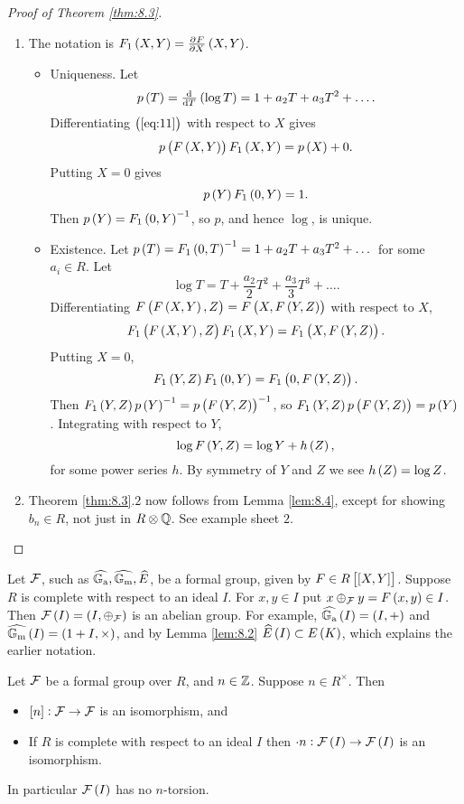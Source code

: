 \pagebreak

\begin{proof}[Proof of Theorem \ref{thm:8.3}]
\hfill
\begin{enumerate}
\item The notation is $ F_1\br{X, Y} = \tpd{F}{X}\br{X, Y} $.
\begin{itemize}
\item Uniqueness. Let
$$ p\br{T} = \tod{}{T}\br{\log T} = 1 + a_2T + a_3T^2 + \dots. $$
Differentiating $ \br{\ref{eq:11}} $ with respect to $ X $ gives
$$ p\br{F\br{X, Y}}F_1\br{X, Y} = p\br{X} + 0. $$
Putting $ X = 0 $ gives
$$ p\br{Y}F_1\br{0, Y} = 1. $$
Then $ p\br{Y} = F_1\br{0, Y}^{-1} $, so $ p $, and hence $ \log $, is unique.
\item Existence. Let $ p\br{T} = F_1\br{0, T}^{-1} = 1 + a_2T + a_3T^2 + \dots $ for some $ a_i \in R $. Let
$$ \log T = T + \dfrac{a_2}{2}T^2 + \dfrac{a_3}{3}T^3 + \dots. $$
Differentiating $ F\br{F\br{X, Y}, Z} = F\br{X, F\br{Y, Z}} $ with respect to $ X $,
$$ F_1\br{F\br{X, Y}, Z}F_1\br{X, Y} = F_1\br{X, F\br{Y, Z}}. $$
Putting $ X = 0 $,
$$ F_1\br{Y, Z}F_1\br{0, Y} = F_1\br{0, F\br{Y, Z}}. $$
Then $ F_1\br{Y, Z}p\br{Y}^{-1} = p\br{F\br{Y, Z}}^{-1} $, so $ F_1\br{Y, Z}p\br{F\br{Y, Z}} = p\br{Y} $. Integrating with respect to $ Y $,
$$ \log F\br{Y, Z} = \log Y + h\br{Z}, $$
for some power series $ h $. By symmetry of $ Y $ and $ Z $ we see $ h\br{Z} = \log Z $.
\end{itemize}
\item Theorem \ref{thm:8.3}.$ 2 $ now follows from Lemma \ref{lem:8.4}, except for showing $ b_n \in R $, not just in $ R \otimes \mathbb{Q} $. See example sheet $ 2 $.
\end{enumerate}
\end{proof}

\begin{notation*}
Let $ \mathcal{F} $, such as $ \widehat{\mathbb{G}_{\mathrm{a}}}, \widehat{\mathbb{G}_{\mathrm{m}}}, \widehat{E} $, be a formal group, given by $ F \in R\sbr{\sbr{X, Y}} $. Suppose $ R $ is complete with respect to an ideal $ I $. For $ x, y \in I $ put $ x \oplus_\FFF y = F\br{x, y} \in I $. Then $ \FFF\br{I} = \br{I, \oplus_\FFF} $ is an abelian group. For example, $ \widehat{\GG_\a}\br{I} = \br{I, +} $ and $ \widehat{\GG_\m}\br{I} = \br{1 + I, \times} $, and by Lemma \ref{lem:8.2} $ \widehat{E}\br{I} \subset E\br{K} $, which explains the earlier notation.
\end{notation*}

\begin{corollary}
Let $ \mathcal{F} $ be a formal group over $ R $, and $ n \in \mathbb{Z} $. Suppose $ n \in R^\times $. Then
\begin{itemize}
\item $ \sbr{n} : \FFF \to \FFF $ is an isomorphism, and
\item If $ R $ is complete with respect to an ideal $ I $ then $ \cdot n : \FFF\br{I} \to \FFF\br{I} $ is an isomorphism.
\end{itemize}
In particular $ \FFF\br{I} $ has no $ n $-torsion.
\end{corollary}

